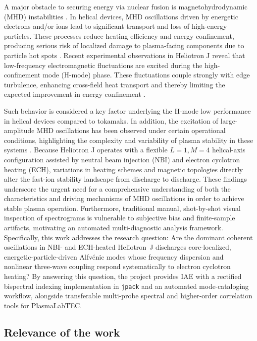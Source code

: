 A major obstacle to securing energy via nuclear fusion is magnetohydrodynamic (MHD) instabilities \cite{Adulsiriswad_2024}. In helical devices, MHD oscillations driven by energetic electrons and/or ions lead to significant transport and loss of high-energy particles. These processes reduce heating efficiency and energy confinement, producing serious risk of localized damage to plasma-facing components due to particle hot spots \cite{Zhong2024}. Recent experimental observations in Heliotron J reveal that low-frequency electromagnetic fluctuations are excited during the high-confinement mode (H-mode) phase. These fluctuations couple strongly with edge turbulence, enhancing cross-field heat transport and thereby limiting the expected improvement in energy confinement \cite{Kin2025}.

Such behavior is considered a key factor underlying the H-mode low performance in helical devices compared to tokamaks. In addition, the excitation of large-amplitude MHD oscillations has been observed under certain operational conditions, highlighting the complexity and variability of plasma stability in these systems \cite{Miyashita2025}. Because Heliotron J operates with a flexible $L=1, M=4$ helical-axis configuration assisted by neutral beam injection (NBI) and electron cyclotron heating (ECH), variations in heating schemes and magnetic topologies directly alter the fast-ion stability landscape from discharge to discharge. These findings underscore the urgent need for a comprehensive understanding of both the characteristics and driving mechanisms of MHD oscillations in order to achieve stable plasma operation. Furthermore, traditional manual, shot-by-shot visual inspection of spectrograms is vulnerable to subjective bias and finite-sample artifacts, motivating an automated multi-diagnostic analysis framework. Specifically, this work addresses the research question: Are the dominant coherent oscillations in NBI- and ECH-heated Heliotron~J discharges core-localized, energetic-particle-driven Alfv\'enic modes whose frequency dispersion and nonlinear three-wave coupling respond systematically to electron cyclotron heating? By answering this question, the project provides IAE with a rectified bispectral indexing implementation in \texttt{jpack} and an automated mode-cataloging workflow, alongside transferable multi-probe spectral and higher-order correlation tools for PlasmaLabTEC.

\subsection{Relevance of the work}


